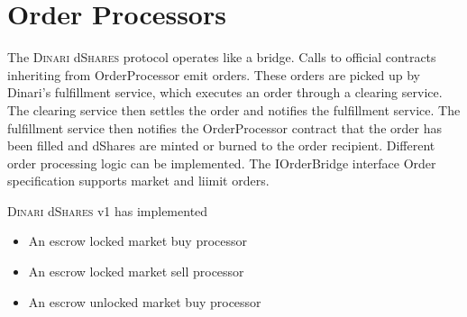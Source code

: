 \documentclass[sigconf,nonacm,prologue,table]{acmart}
\numberwithin{equation}{section}
\theoremstyle{definition}
\theoremstyle{remark}
\newcommand{\dshares}{\textsc{Dinari} d\textsc{Shares} }
\begin{document}
\section{Order Processors}
\label{sec:Processors}

The \dshares protocol operates like a bridge. Calls to official contracts inheriting from OrderProcessor emit orders. These orders are picked up by Dinari's fulfillment service, which executes an order through a clearing service. The clearing service then settles the order and notifies the fulfillment service. The fulfillment service then notifies the OrderProcessor contract that the order has been filled and dShares are minted or burned to the order recipient. Different order processing logic can be implemented. The IOrderBridge interface Order specification supports market and liimit orders.

\dshares v1 has implemented
\begin{itemize}
    \item An escrow locked market buy processor
    \item An escrow locked market sell processor
    \item An escrow unlocked market buy processor
\end{itemize}

  
\end{document}
